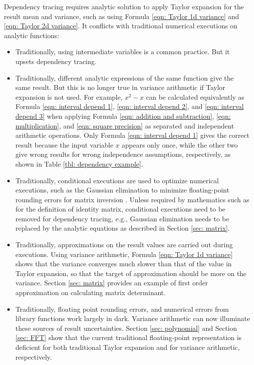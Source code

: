 \documentclass[twoside]{article}
\numberwithin{equation}{section}
\begin{document}
Dependency tracing requires analytic solution to apply Taylor expansion for the result mean and variance, such as using Formula \eqref{eqn: Taylor 1d variance} and \eqref{eqn: Taylor 2d variance}.
It conflicts with traditional numerical executions on analytic functions:
\begin{itemize}

\item
Traditionally, using intermediate variables is a common practice.
But it upsets dependency tracing.

\item 
Traditionally, different analytic expressions of the same function give the same result.
But this is no longer true in variance arithmetic if Taylor expansion is not used.
For example, $x^2 - x$ can be calculated equivalently as Formula \eqref{eqn: interval depend 1}, \eqref{eqn: interval depend 2}, and \eqref{eqn: interval depend 3} when applying Formula \eqref{eqn: addition and subtraction}, \eqref{eqn: multiplication}, and \eqref{eqn: square precision} as separated and independent arithmetic operations.
Only Formula \eqref{eqn: interval depend 1} gives the correct result because the input variable $x$ appears only once, while the other two give wrong results for wrong independence assumptions, respectively, as shown in Table \ref{tbl: dependency example}.

\item
Traditionally, conditional executions are used to optimize numerical executions, such as the Gaussian elimination to minimize floating-point rounding errors for matrix inversion \cite{Linear_Algebra}.  
Unless required by mathematics such as for the definition of identity matrix, conditional executions need to be removed for dependency tracing, e.g., Gaussian elimination needs to be replaced by the analytic equations as described in Section \ref{sec: matrix}.

\item 
Traditionally, approximations on the result values are carried out during executions.
Using variance arithmetic, Formula \eqref{eqn: Taylor 1d variance} shows that the variance converges much slower than that of the value in Taylor expansion, so that the target of approximation should be more on the variance.
Section \ref{sec: matrix} provides an example of first order approximation on calculating matrix determinant.

\item
Traditionally, floating point rounding errors, and numerical errors from library functions work largely in dark.
Variance arithmetic can now illuminate these sources of result uncertainties.
Section \ref{sec: polynomial} and Section \ref{sec: FFT} show that the current traditional floating-point representation is deficient for both traditional Taylor expansion and for variance arithmetic, respectively.


\end{itemize}
\end{document}
